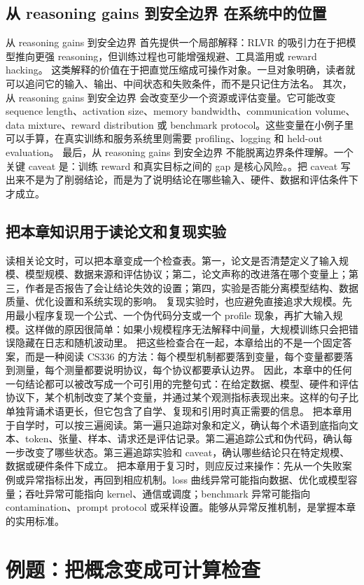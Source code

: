 \documentclass[a4paper]{article}
\begin{document}
\subsection{从 reasoning gains 到安全边界 在系统中的位置}
从 reasoning gains 到安全边界 首先提供一个局部解释：RLVR 的吸引力在于把模型推向更强 reasoning，但训练过程也可能增强规避、工具滥用或 reward hacking。 这类解释的价值在于把直觉压缩成可操作对象。一旦对象明确，读者就可以追问它的输入、输出、中间状态和失败条件，而不是只记住方法名。
其次，从 reasoning gains 到安全边界 会改变至少一个资源或评估变量。它可能改变 sequence length、activation size、memory bandwidth、communication volume、data mixture、reward distribution 或 benchmark protocol。这些变量在小例子里可以手算，在真实训练和服务系统里则需要 profiling、logging 和 held-out evaluation。
最后，从 reasoning gains 到安全边界 不能脱离边界条件理解。一个关键 caveat 是：训练 reward 和真实目标之间的 gap 是核心风险。。把 caveat 写出来不是为了削弱结论，而是为了说明结论在哪些输入、硬件、数据和评估条件下才成立。
\subsection{把本章知识用于读论文和复现实验}
读相关论文时，可以把本章变成一个检查表。第一，论文是否清楚定义了输入规模、模型规模、数据来源和评估协议；第二，论文声称的改进落在哪个变量上；第三，作者是否报告了会让结论失效的设置；第四，实验是否能分离模型结构、数据质量、优化设置和系统实现的影响。
复现实验时，也应避免直接追求大规模。先用最小程序复现一个公式、一个伪代码分支或一个 profile 现象，再扩大输入规模。这样做的原因很简单：如果小规模程序无法解释中间量，大规模训练只会把错误隐藏在日志和随机波动里。
把这些检查合在一起，本章给出的不是一个固定答案，而是一种阅读 CS336 的方法：每个模型机制都要落到变量，每个变量都要落到测量，每个测量都要说明协议，每个协议都要承认边界。
因此，本章中的任何一句结论都可以被改写成一个可引用的完整句式：在给定数据、模型、硬件和评估协议下，某个机制改变了某个变量，并通过某个观测指标表现出来。这样的句子比单独背诵术语更长，但它包含了自学、复现和引用时真正需要的信息。
把本章用于自学时，可以按三遍阅读。第一遍只追踪对象和定义，确认每个术语到底指向文本、token、张量、样本、请求还是评估记录。第二遍追踪公式和伪代码，确认每一步改变了哪些状态。第三遍追踪实验和 caveat，确认哪些结论只在特定规模、数据或硬件条件下成立。
把本章用于复习时，则应反过来操作：先从一个失败案例或异常指标出发，再回到相应机制。loss 曲线异常可能指向数据、优化或模型容量；吞吐异常可能指向 kernel、通信或调度；benchmark 异常可能指向 contamination、prompt protocol 或采样设置。能够从异常反推机制，是掌握本章的实用标准。
\section{例题：把概念变成可计算检查}
\end{document}
